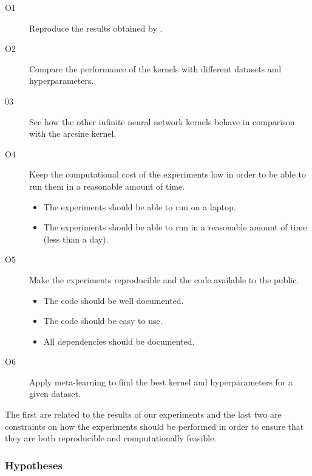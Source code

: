 \begin{description}
    \item[O1] Reproduce the results obtained by
        \textcite{frenayParameterinsensitiveKernelExtreme2011}.
    \item[O2] Compare the performance of the kernels with different datasets and
        hyperparameters.
    \item[03] See how the other infinite neural network kernels behave in comparison
        with the arcsine kernel.
    \item[O4] Keep the computational cost of the experiments low in order to be
        able to run them in a reasonable amount of time.
        \begin{itemize}
            \item The experiments should be able to run on a laptop.
            \item The experiments should be able to run in a reasonable amount
                  of time (less than a day).
        \end{itemize}
    \item[O5] Make the experiments reproducible and the code available to the
        public. %
        \begin{itemize}
            \item The code should be well documented.
            \item The code should be easy to use.
            \item All dependencies should be documented.
        \end{itemize}
    \item[O6] Apply meta-learning to find the best kernel and hyperparameters
        for a given dataset.
\end{description}

The first are related to the results of our experiments and the last two are
constraints on how the experiments should be performed in order to ensure that
they are both reproducible and computationally feasible.

\subsubsection{Hypotheses}
\label{sec:objectives_and_hypotheses}


